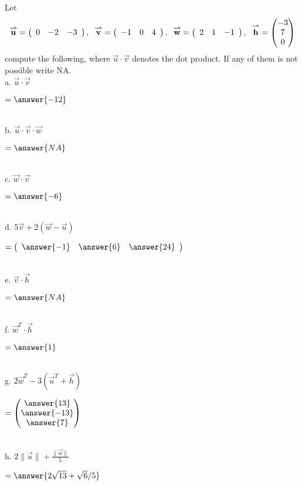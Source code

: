 \documentclass{ximera}
\author{Parisa Fatheddin}
\begin{document}
\begin{exercise}


Let 
\begin{equation*}
\vec{u} = \left(\begin{array}{ccc} 
0 & -2& -3
\end{array}\right), \hspace{.2cm} \vec{v} = \left(\begin{array}{ccc} -1 & 0 & 4\end{array}\right), \hspace{.2cm} \vec{w} = \left(\begin{array}{ccc} 2 & 1 & -1 \end{array}\right), \hspace{.2cm} \vec{h} = \begin{pmatrix} -3\\
7\\
0
\end{pmatrix}
\end{equation*}
compute the following, where $\vec{u}\cdot \vec{v}$ denotes the dot product. If any of them is not possible write NA. \\

a. $\vec{u}\cdot \vec{v}$ \begin{prompt}$= \answer{-12}$\end{prompt}\\

b. $\vec{u}\cdot \vec{v} \cdot \vec{w} $\begin{prompt} $= \answer{NA}$\end{prompt}\\

c. $\vec{w}\cdot \vec{v} $\begin{prompt} $=\answer{-6}$\end{prompt}\\

d. $5 \vec{v} + 2\left(\vec{w}-\vec{u}\right)$ \begin{prompt} $= \left(\begin{array}{ccc} \answer{-1} & \answer{6} & \answer{24}
\end{array}\right)$ \end{prompt}\\

e. $\vec{v} \cdot \vec{h}$ \begin{prompt}$= \answer{NA}$\end{prompt}\\

f. $\vec{w}^{T} \cdot \vec{h}$ \begin{prompt} $= \answer{1}$\end{prompt}\\

g. $2 \vec{w}^{T} - 3\left(\vec{u}^{T} + \vec{h}\right)$\begin{prompt}$= \begin{pmatrix} \answer{13} \\
\answer{-13}\\
\answer{7}
\end{pmatrix}$\end{prompt}\\

h. $2 \|\vec{u}\| + \frac{\|\vec{w}\|}{5} $\begin{prompt} $= \answer{2\sqrt{13} + \sqrt{6}/5}$\end{prompt}
\end{exercise}
\end{document}
